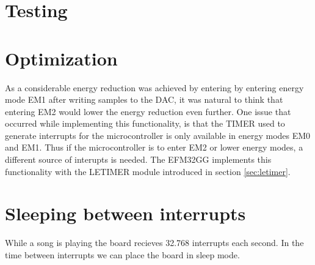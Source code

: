 \section{Testing}

\section{Optimization}

As a considerable energy reduction was achieved by entering by entering energy mode EM1 after writing samples to the DAC, it was natural to think that entering EM2 would lower the energy reduction even further. One issue that occurred while implementing this functionality, is that the TIMER used to generate interrupts for the microcontroller is only available in energy modes EM0 and EM1. Thus if the microcontroller is to enter EM2 or lower energy modes, a different source of interupts is needed. The EFM32GG implements this functionality with the LETIMER module introduced in section \ref{sec:letimer}.

\section{Sleeping between interrupts}
While a song is playing the board recieves 32.768 interrupts each second. In the time between interrupts we can place the board in sleep mode.

